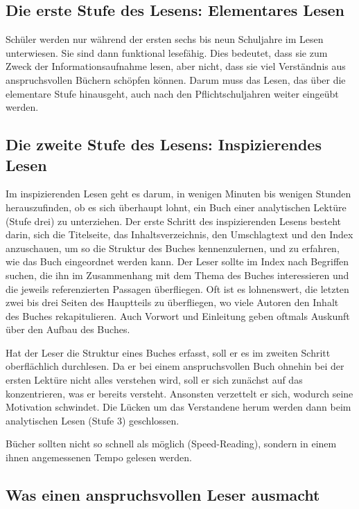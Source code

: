 \documentclass[a4paper,12pt]{scrartcl}
\begin{document}
\subsection{Die erste Stufe des Lesens: Elementares Lesen}

Schüler werden nur während der ersten sechs bis neun Schuljahre im Lesen unterwiesen. Sie sind dann funktional lesefähig. Dies bedeutet, dass sie zum Zweck der Informationsaufnahme lesen, aber nicht, dass sie viel Verständnis aus anspruchsvollen Büchern schöpfen können. Darum muss das Lesen, das über die elementare Stufe hinausgeht, auch nach den Pflichtschuljahren weiter eingeübt werden.

\subsection{Die zweite Stufe des Lesens: Inspizierendes Lesen}

Im inspizierenden Lesen geht es darum, in wenigen Minuten bis wenigen Stunden herauszufinden, ob es sich überhaupt lohnt, ein Buch einer analytischen Lektüre (Stufe drei) zu unterziehen. Der erste Schritt des inspizierenden Lesens besteht darin, sich die Titelseite, das Inhaltsverzeichnis, den Umschlagtext und den Index anzuschauen, um so die Struktur des Buches kennenzulernen, und zu erfahren, wie das Buch eingeordnet werden kann. Der Leser sollte im Index nach Begriffen suchen, die ihn im Zusammenhang mit dem Thema des Buches interessieren und die jeweils referenzierten Passagen überfliegen. Oft ist es lohnenswert, die letzten zwei bis drei Seiten des Hauptteils zu überfliegen, wo viele Autoren den Inhalt des Buches rekapitulieren. Auch Vorwort und Einleitung geben oftmals Auskunft über den Aufbau des Buches.

Hat der Leser die Struktur eines Buches erfasst, soll er es im zweiten Schritt oberflächlich durchlesen. Da er bei einem anspruchsvollen Buch ohnehin bei der ersten Lektüre nicht alles verstehen wird, soll er sich zunächst auf das konzentrieren, was er bereits versteht. Ansonsten verzettelt er sich, wodurch seine Motivation schwindet. Die Lücken um das Verstandene herum werden dann beim analytischen Lesen (Stufe 3) geschlossen.

Bücher sollten nicht so schnell als möglich (Speed-Reading), sondern in einem ihnen angemessenen Tempo gelesen werden.

\subsection{Was einen anspruchsvollen Leser ausmacht}
\end{document}
